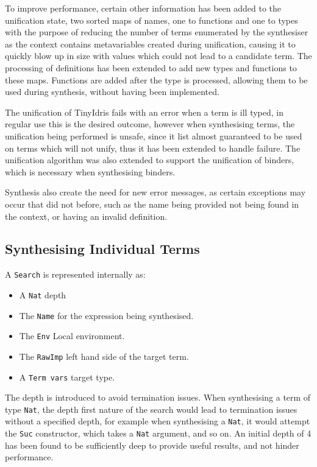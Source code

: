 \documentclass[a4paper]{article}
\begin{document}
To improve performance, certain other information has been added to the unification state, two sorted maps of names, one to functions and one to types
with the purpose of reducing the number of terms enumerated by the synthesiser as the 
context contains metavariables created during unification, causing it to quickly blow up in size  with values which could not lead to 
a candidate term. 
The processing of definitions has been extended to add new types and functions to these maps. Functions are added 
after the type is processed, allowing them to be used during synthesis, without having been implemented. 

The unification of TinyIdris fails with an error when a term is ill typed, 
in regular use this is the desired outcome, however when synthesising 
terms, the unification being performed is unsafe, since it list almost
guaranteed to be used on terms which will not unify, thus it has been 
extended to handle failure. The unification algorithm was also extended
to support the unification of binders, which is necessary when 
synthesising binders.  

Synthesis also create the need for new error messages, as certain exceptions
may occur that did not before, such as the name being provided not being found in the context, 
or having an invalid definition.
\subsection{Synthesising Individual Terms}
\label{sec:orgc850bb8}

A \texttt{Search} is represented internally as: 
\begin{itemize}
\item A \texttt{Nat} depth
\item The \texttt{Name} for the expression being synthesised.
\item The \texttt{Env} Local environment.
\item The \texttt{RawImp} left hand side of the target term.
\item A \texttt{Term vars} target type.
\end{itemize}

The depth is introduced to avoid termination issues. When synthesising a term of type \texttt{Nat}, the depth first nature of the 
search would lead to termination issues without a specified depth, for example when synthesising a \texttt{Nat}, it would attempt 
the \texttt{Suc} constructor, which takes a \texttt{Nat} argument, and so on. An initial depth of 4 has been found to be sufficiently deep 
to provide useful results, and not hinder performance. 
\end{document}
